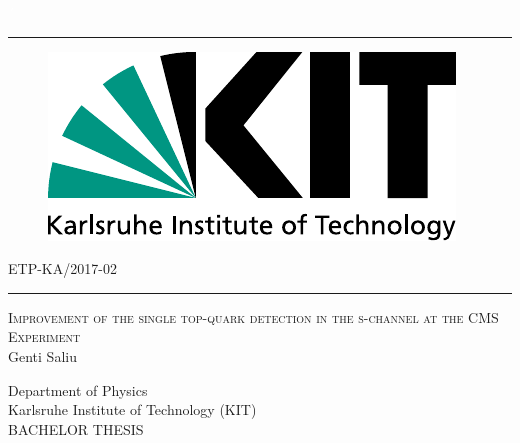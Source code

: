 \begin{titlepage}
  \begin{addmargin}[1.5cm]{0cm}
    \thispagestyle{empty}
    \vspace{-1cm}
    \begin{center}
                \textcolor{white}{´}\vspace{-3.5cm}
                  \rule{\linewidth}{0.75pt}
                    \vspace{-0.15cm}

\begin{figure}[htbp]
  \centering
  \hspace{26pt}
  \includegraphics[scale=0.5]{assets/LogoKit_en}
\end{figure}

      \vspace{-0.45cm}
\hspace{9cm}ETP-KA/2017-02
\rule{\linewidth}{0.75pt}

\vspace{0.8cm}


\Large{\textsc{Improvement of the single top-quark detection in the s-channel at the CMS Experiment}}\\
\vspace{0.9cm}
\Large{Genti Saliu}\\
\vspace{0.9cm}
\vspace{1cm}
\large{Department of Physics\\
  
  Karlsruhe Institute of Technology (KIT)\\
  \vspace{0.825 cm}
  \large{BACHELOR THESIS}\\
  \vspace{0.825 cm}

}
\end{center}
\end{addmargin}
\end{titlepage}
